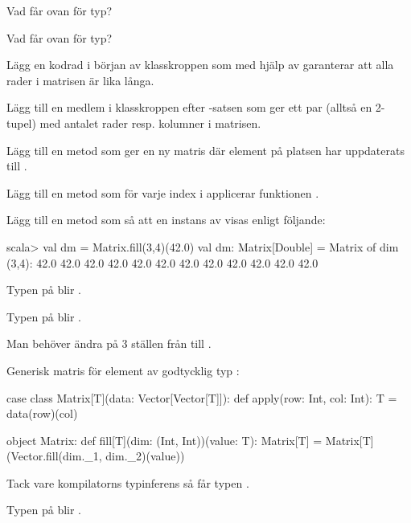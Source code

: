 \Subtask Vad får  ovan för typ?

\Subtask Vad får  ovan för typ?

\Subtask Lägg en kodrad i början av klasskroppen som med hjälp av  garanterar att alla rader i matrisen är lika långa.

\Subtask Lägg till en medlem  i klasskroppen efter -satsen som ger ett par (alltså en 2-tupel) med antalet rader resp. kolumner i matrisen.

\Subtask Lägg till en metod  som ger en ny matris där element på platsen  har uppdaterats till .

\Subtask Lägg till en metod  som för varje index i  applicerar funktionen .

\Subtask Lägg till en metod  som så att en instans av  visas enligt följande:
\begin{REPLnonum}
scala> val dm = Matrix.fill(3,4)(42.0)
val dm: Matrix[Double] =
Matrix of dim (3,4):
42.0 42.0 42.0 42.0
42.0 42.0 42.0 42.0
42.0 42.0 42.0 42.0
\end{REPLnonum}


\SOLUTION


\TaskSolved \what

\SubtaskSolved Typen på  blir .

\SubtaskSolved Typen på  blir .

\SubtaskSolved Man behöver ändra på 3 ställen från  till .

\SubtaskSolved Generisk matris  för element av godtycklig typ :

\begin{CodeSmall}
case class Matrix[T](data: Vector[Vector[T]]):
  def apply(row: Int, col: Int): T = data(row)(col)

object Matrix:
  def fill[T](dim: (Int, Int))(value: T): Matrix[T] =
    Matrix[T](Vector.fill(dim._1, dim._2)(value))
\end{CodeSmall}

\SubtaskSolved Tack vare kompilatorns typinferens så får  typen .

\SubtaskSolved Typen på  blir .

